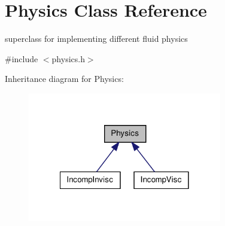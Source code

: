 \hypertarget{classPhysics}{\section{\-Physics \-Class \-Reference}
\label{classPhysics}
}


superclass for implementing different fluid physics  




{\ttfamily \#include $<$physics.\-h$>$}



\-Inheritance diagram for \-Physics\-:\nopagebreak
\begin{figure}[H]
\begin{center}
\leavevmode
\includegraphics[width=240pt]{classPhysics__inherit__graph}
\end{center}
\end{figure}

